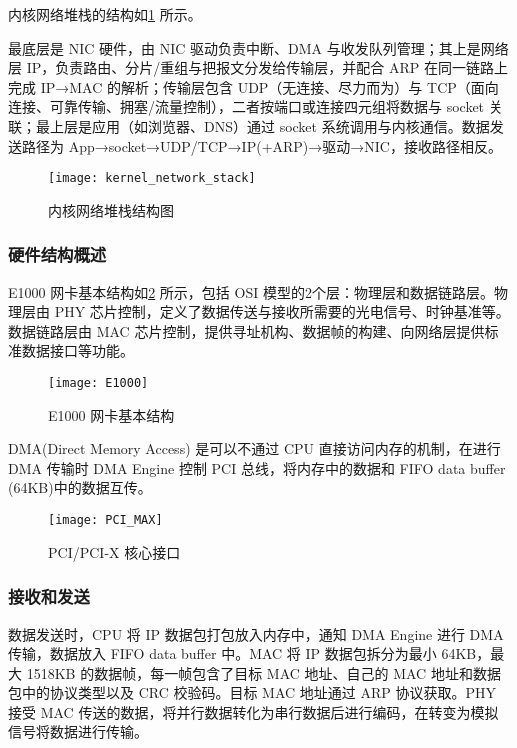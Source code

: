 内核网络堆栈的结构如\cref{fig:kernel_network_stack} 所示。

最底层是 NIC 硬件，由 NIC 驱动负责中断、DMA 与收发队列管理；其上是网络层 IP，负责路由、分片/重组与把报文分发给传输层，并配合 ARP 在同一链路上完成 IP→MAC 的解析；传输层包含 UDP（无连接、尽力而为）与 TCP（面向连接、可靠传输、拥塞/流量控制），二者按端口或连接四元组将数据与 socket 关联；最上层是应用（如浏览器、DNS）通过 socket 系统调用与内核通信。数据发送路径为 App→socket→UDP/TCP→IP(+ARP)→驱动→NIC，接收路径相反。

\begin{figure}[!htb]
	\centering
	\texttt{[image: kernel\_network\_stack]}
	\caption{内核网络堆栈结构图}
	\label{fig:kernel_network_stack}
\end{figure}

\subsubsection{硬件结构概述}

E1000 网卡基本结构如\cref{fig:E1000} 所示，包括 OSI 模型的2个层：物理层和数据链路层。物理层由 PHY 芯片控制，定义了数据传送与接收所需要的光电信号、时钟基准等。数据链路层由 MAC 芯片控制，提供寻址机构、数据帧的构建、向网络层提供标准数据接口等功能。

\begin{figure}[!htb]
	\centering
	\texttt{[image: E1000]}
	\caption{E1000 网卡基本结构}
	\label{fig:E1000}
\end{figure}

DMA(Direct Memory Access) 是可以不通过 CPU 直接访问内存的机制，在进行 DMA 传输时 DMA Engine 控制 PCI 总线，将内存中的数据和 FIFO data buffer (64KB)中的数据互传。

\begin{figure}[!htb]
	\centering
	\texttt{[image: PCI\_MAX]}
	\caption{PCI/PCI-X 核心接口}
	\label{fig:PCI_MAX}
\end{figure}

\subsubsection{接收和发送}

数据发送时，CPU 将 IP 数据包打包放入内存中，通知 DMA Engine 进行 DMA 传输，数据放入 FIFO data buffer 中。MAC 将 IP 数据包拆分为最小 64KB，最大 1518KB 的数据帧，每一帧包含了目标 MAC 地址、自己的 MAC 地址和数据包中的协议类型以及 CRC 校验码。目标 MAC 地址通过 ARP 协议获取。PHY 接受 MAC 传送的数据，将并行数据转化为串行数据后进行编码，在转变为模拟信号将数据进行传输。


